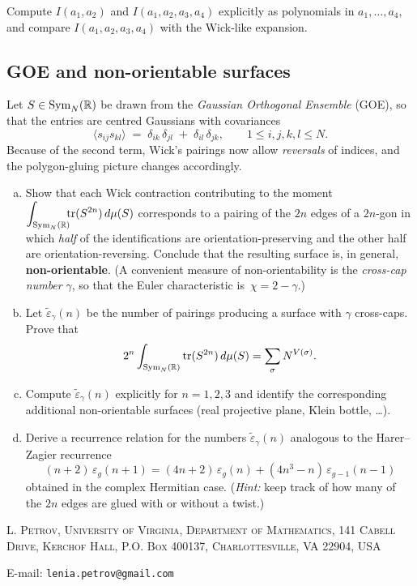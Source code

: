 \documentclass[letterpaper,11pt,oneside,reqno]{article}
\numberwithin{equation}{section}
\theoremstyle{definition}
\begin{document}
Compute $I(a_1, a_2)$ and $I(a_1, a_2, a_3, a_4)$ explicitly as polynomials in $a_1,\ldots, a_4$,
and compare $I(a_1, a_2, a_3, a_4)$ with the Wick-like expansion.

\subsection{GOE and non-orientable surfaces}
\label{prob:goe-nonorient}

Let $S\in\operatorname{Sym}_N(\Bbb R)$ be drawn from the \emph{Gaussian Orthogonal Ensemble} (GOE), so that the entries
are centred Gaussians with covariances
\[
  \langle s_{ij}s_{kl}\rangle
  \;=\;
  \delta_{ik}\,\delta_{jl}\;+\;\delta_{il}\,\delta_{jk},
  \qquad 1\le i,j,k,l\le N.
\]
Because of the second term, Wick’s pairings now allow \emph{reversals} of
indices, and the polygon-gluing picture changes accordingly.

\begin{enumerate}[(a)]
  \item
  Show that each Wick contraction contributing to the moment
  $\displaystyle\int_{\operatorname{Sym}_{N}(\Bbb R)}\!\!\!\operatorname{tr}(S^{2n})\,d\mu(S)$
  corresponds to a pairing of the $2n$ edges of a $2n$-gon in which
  \emph{half} of the identifications are orientation-preserving and the
  other half are orientation-reversing.  Conclude that the resulting
  surface is, in general, \textbf{non-orientable}.
  (A convenient measure of non-orientability is the \emph{cross-cap number}
  $\gamma$, so that the Euler characteristic is $\,\chi=2-\gamma$.)

  \item
  Let $\tilde\varepsilon_\gamma(n)$ be the number of pairings producing a
  surface with $\gamma$ cross-caps.
  Prove that
  \[
    2^n\int_{\operatorname{Sym}_{N}(\Bbb R)}\operatorname{tr}(S^{2n})\,d\mu(S)
		=
		\sum_{\sigma}N^{V(\sigma)}.
  \]

  \item
  Compute $\tilde\varepsilon_\gamma(n)$ explicitly for $n=1,2,3$
  and identify the corresponding additional non-orientable surfaces
  (real projective plane, Klein bottle, \dots).

  \item
  Derive a recurrence relation for the numbers $\tilde\varepsilon_\gamma(n)$
  analogous to the Harer–Zagier recurrence
  \[
    (n+2)\,\varepsilon_g(n+1)
    =(4n+2)\,\varepsilon_g(n)
      +(4n^{3}-n)\,\varepsilon_{g-1}(n-1)
  \]
  obtained in the complex Hermitian case.  (\emph{Hint:} keep track of how
  many of the $2n$ edges are glued with or without a twist.)
\end{enumerate}








\medskip

\textsc{L. Petrov, University of Virginia, Department of Mathematics, 141 Cabell Drive, Kerchof Hall, P.O. Box 400137, Charlottesville, VA 22904, USA}

E-mail: \texttt{lenia.petrov@gmail.com}
\end{document}
